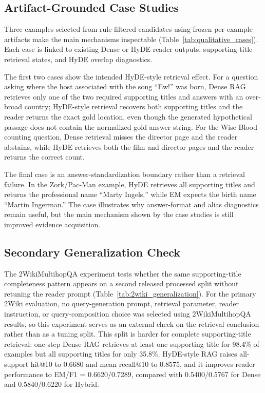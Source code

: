 \subsection{Artifact-Grounded Case Studies}
\label{sec:case_studies}

Three examples selected from rule-filtered candidates using frozen per-example artifacts make the main mechanisms inspectable (Table~\ref{tab:qualitative_cases}). Each case is linked to existing Dense or HyDE reader outputs, supporting-title retrieval states, and HyDE overlap diagnostics.



The first two cases show the intended HyDE-style retrieval effect. For a question asking where the host associated with the song ``Ew!'' was born, Dense RAG retrieves only one of the two required supporting titles and answers with an over-broad country; HyDE-style retrieval recovers both supporting titles and the reader returns the exact gold location, even though the generated hypothetical passage does not contain the normalized gold answer string. For the Wise Blood counting question, Dense retrieval misses the director page and the reader abstains, while HyDE retrieves both the film and director pages and the reader returns the correct count.

The final case is an answer-standardization boundary rather than a retrieval failure. In the Zork/Pac-Man example, HyDE retrieves all supporting titles and returns the professional name ``Marty Ingels,'' while EM expects the birth name ``Martin Ingerman.'' The case illustrates why answer-format and alias diagnostics remain useful, but the main mechanism shown by the case studies is still improved evidence acquisition.

\subsection{Secondary Generalization Check}
\label{sec:2wiki_generalization}

The 2WikiMultihopQA experiment tests whether the same supporting-title completeness pattern appears on a second released processed split without retuning the reader prompt (Table~\ref{tab:2wiki_generalization}). For the primary 2Wiki evaluation, no query-generation prompt, retrieval parameter, reader instruction, or query-composition choice was selected using 2WikiMultihopQA results, so this experiment serves as an external check on the retrieval conclusion rather than as a tuning split. This split is harder for complete supporting-title retrieval: one-step Dense RAG retrieves at least one supporting title for 98.4\% of examples but all supporting titles for only 35.8\%. HyDE-style RAG raises all-support hit@10 to 0.6680 and mean recall@10 to 0.8575, and it improves reader performance to EM/F1 = 0.6620/0.7289, compared with 0.5400/0.5767 for Dense and 0.5840/0.6220 for Hybrid.

